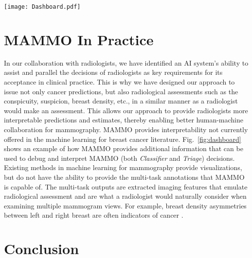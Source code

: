 \documentclass[journal]{IEEEtran}
\begin{document}




\begin{figure*}[!t]
  \texttt{[image: Dashboard.pdf]}
  \caption{Example illustration of MAMMO interpretability by the radiologist in two ways: 1) visualization of MAMMO CNN identified features, and 2) multi-task outputs provide additional assessments for radiologist to scrutinize.}
  \label{fig:dashboard}
\end{figure*}

\section{MAMMO In Practice}

In our collaboration with radiologists, we have identified an AI system’s ability to assist and parallel the decisions of radiologists as key requirements for its acceptance in clinical practice.  This is why we have designed our approach to issue not only cancer predictions, but also radiological assessments such as the conspicuity, suspicion, breast density, etc., in a similar manner as a radiologist would make an assessment. This allows our approach to provide radiologists more interpretable predictions and estimates, thereby enabling better human-machine collaboration for mammography.  MAMMO provides interpretability not currently offered in the machine learning for breast cancer literature.  Fig.~\ref{fig:dashboard} shows an example of how MAMMO provides additional information that can be used to debug and interpret MAMMO (both \textit{Classifier} and \textit{Triage}) decisions.  Existing methods in machine learning for mammography provide visualizations, but do not have the ability to provide the multi-task annotations that MAMMO is capable of.  The multi-task outputs are extracted imaging features that emulate radiological assessment and are what a radiologist would naturally consider when examining multiple mammogram views.  For example, breast density asymmetries between left and right breast are often indicators of cancer \cite{breast-asymmetry1}.

\section{Conclusion}
\end{document}
